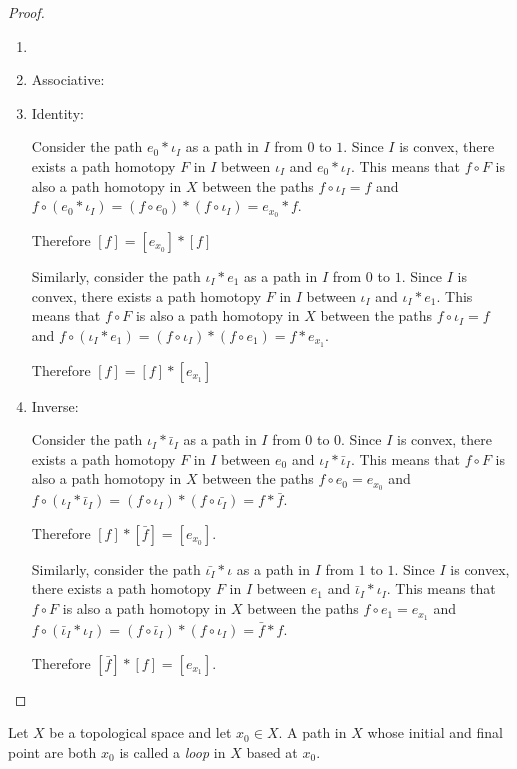 \documentclass[letterpaper,12pt,fleqn]{article}
\renewcommand{\i}{\iota}
\begin{document}
\begin{proof}
  \begin{enumerate}
  \item[]
  \item Associative:

  \item Identity:

    Consider the path \(e_0*\i_I\) as a path in \(I\) from \(0\) to \(1\).  Since \(I\) is convex, there exists a
    path homotopy \(F\) in \(I\) between \(\i_I\) and \(e_0*\i_I\).  This means that \(f\circ F\) is also a path
    homotopy in \(X\) between the paths \(f\circ\i_I=f\) and \(f\circ(e_0*\i_I)=(f\circ
    e_0)*(f\circ\i_I)=e_{x_0}*f\).

    Therefore \([f]=[e_{x_0}]*[f]\)

    Similarly, consider the path \(\i_I*e_1\) as a path in \(I\) from \(0\) to \(1\).  Since \(I\) is convex, there
    exists a path homotopy \(F\) in \(I\) between \(\i_I\) and \(\i_I*e_1\).  This means that \(f\circ F\) is also
    a path homotopy in \(X\) between the paths \(f\circ\i_I=f\) and \(f\circ(\i_I*e_1)=(f\circ\i_I)*(f\circ
    e_1)=f*e_{x_1}\).

    Therefore \([f]=[f]*[e_{x_1}]\)

  \item Inverse:

    Consider the path \(\i_I*\bar{\i}_I\) as a path in \(I\) from \(0\) to \(0\).  Since \(I\) is convex, there
    exists a path homotopy \(F\) in \(I\) between \(e_0\) and \(\i_I*\bar{\i}_I\).  This means that \(f\circ F\) is
    also a path homotopy in \(X\) between the paths \(f\circ e_0=e_{x_0}\) and
    \(f\circ(\i_I*\bar{\i}_I)=(f\circ\i_I)*(f\circ\bar{\i_I})=f*\bar{f}\).

    Therefore \([f]*[\bar{f}]=[e_{x_0}]\).

    Similarly, consider the path \(\bar{\i_I}*\i\) as a path in \(I\) from \(1\) to \(1\).  Since \(I\) is convex,
    there exists a path homotopy \(F\) in \(I\) between \(e_1\) and \(\bar{\i}_I*\i_I\).  This means that \(f\circ F\)
    is also a path homotopy in \(X\) between the paths \(f\circ e_1=e_{x_1}\) and
    \(f\circ(\bar{\i}_I*\i_I)=(f\circ\bar{\i}_I)*(f\circ\i_I)=\bar{f}*f\).

    Therefore \([\bar{f}]*[f]=[e_{x_1}]\).
  \end{enumerate}
\end{proof}

\begin{definition}[Loop]
  Let \(X\) be a topological space and let \(x_0\in X\).  A path in \(X\) whose initial and final point are both
  \(x_0\) is called a \emph{loop} in \(X\) based at \(x_0\).
\end{definition}
\end{document}
